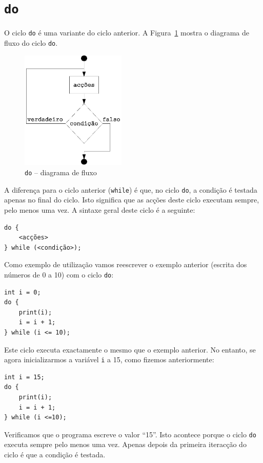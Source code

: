 \section{\texttt{do}}
O ciclo \texttt{do} é uma variante do ciclo anterior.
A Figura~\ref{fig:fazer} mostra o diagrama de fluxo do ciclo \texttt{do}.
\begin{figure}[!h]
	\centering
		\includegraphics[width=5cm]{images/fazer.eps}
	\caption{\texttt{do} -- diagrama de fluxo}
	\label{fig:fazer}
\end{figure}

A diferença para o ciclo anterior (\texttt{while}) é que, no ciclo \texttt{do}, a condição é testada apenas no final do ciclo. Isto significa que as acções deste ciclo executam sempre, pelo menos uma vez. A sintaxe geral deste ciclo é a seguinte:
\begin{lstlisting}
do {
    <acções>
} while (<condição>);
\end{lstlisting}

Como exemplo de utilização vamos reescrever o exemplo anterior (escrita dos números de 0 a 10) com o ciclo \texttt{do}:
\begin{lstlisting}
int i = 0;
do {
    print(i);
    i = i + 1;
} while (i <= 10);
\end{lstlisting}
Este ciclo executa exactamente o mesmo que o exemplo anterior. No entanto, se agora inicializarmos a variável \texttt{i} a 15, como fizemos anteriormente:
\begin{lstlisting}
int i = 15;
do {
    print(i);
    i = i + 1;
} while (i <=10);
\end{lstlisting}
Verificamos que o programa escreve o valor ``15''. Isto acontece porque o ciclo \texttt{do} executa sempre pelo menos uma vez. Apenas depois da primeira iteracção do ciclo é que a condição é testada.

